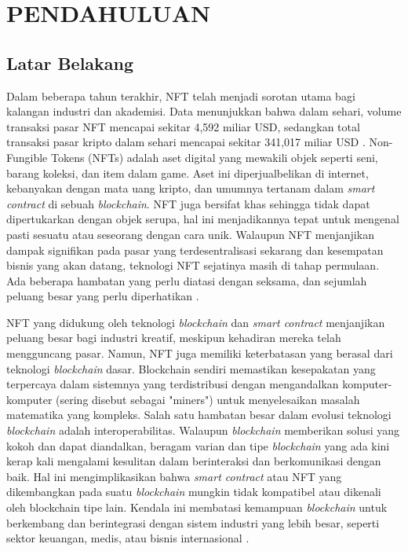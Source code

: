 \chapter{PENDAHULUAN}
\label{chap:pendahuluan}


\section{Latar Belakang}
\label{sec:latarbelakang}

Dalam beberapa tahun terakhir, NFT telah menjadi sorotan utama bagi kalangan industri dan akademisi. Data menunjukkan bahwa dalam sehari, volume transaksi pasar NFT mencapai sekitar 4,592 miliar USD, sedangkan total transaksi pasar kripto dalam sehari mencapai sekitar 341,017 miliar USD \cite{Wang2021}. Non-Fungible Tokens (NFTs) adalah aset digital yang mewakili objek seperti seni, barang koleksi, dan item dalam game. Aset ini diperjualbelikan di internet, kebanyakan dengan mata uang kripto, dan umumnya tertanam dalam \emph{smart contract} di sebuah \emph{blockchain}. NFT juga bersifat khas sehingga tidak dapat dipertukarkan dengan objek serupa, hal ini menjadikannya tepat untuk mengenal pasti sesuatu atau seseorang dengan cara unik. Walaupun NFT menjanjikan dampak signifikan pada pasar yang terdesentralisasi sekarang dan kesempatan bisnis yang akan datang, teknologi NFT sejatinya masih di tahap permulaan. Ada beberapa hambatan yang perlu diatasi dengan seksama, dan sejumlah peluang besar yang perlu diperhatikan \cite{Khan2021}.

NFT yang didukung oleh teknologi \emph{blockchain} dan \emph{smart contract} menjanjikan peluang besar bagi industri kreatif, meskipun kehadiran mereka telah mengguncang pasar. Namun, NFT juga memiliki keterbatasan yang berasal dari teknologi \emph{blockchain} dasar. Blockchain sendiri memastikan kesepakatan yang terpercaya dalam sistemnya yang terdistribusi dengan mengandalkan komputer-komputer (sering disebut sebagai "miners") untuk menyelesaikan masalah matematika yang kompleks. Salah satu hambatan besar dalam evolusi teknologi \emph{blockchain} adalah interoperabilitas. Walaupun \emph{blockchain} memberikan solusi yang kokoh dan dapat diandalkan, beragam varian dan tipe \emph{blockchain} yang ada kini kerap kali mengalami kesulitan dalam berinteraksi dan berkomunikasi dengan baik. Hal ini mengimplikasikan bahwa \emph{smart contract} atau NFT yang dikembangkan pada suatu \emph{blockchain} mungkin tidak kompatibel atau dikenali oleh blockchain tipe lain. Kendala ini membatasi kemampuan \emph{blockchain} untuk berkembang dan berintegrasi dengan sistem industri yang lebih besar, seperti sektor keuangan, medis, atau bisnis internasional \cite{Malik2023}.

